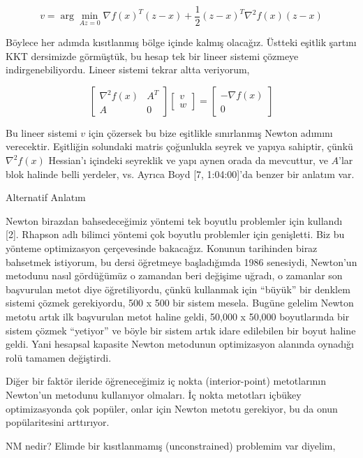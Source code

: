 \documentclass[12pt,fleqn]{article}\usepackage{../../common}
\begin{document}
$$
v = \arg\min_{Az=0} \nabla f(x)^T (z-x) + \frac{1}{2} (z-x)^T \nabla^2 f(x)(z-x)
$$

Böylece her adımda kısıtlanmış bölge içinde kalmış olacağız. Üstteki
eşitlik şartını KKT dersimizde görmüştük, bu hesap tek bir lineer sistemi
çözmeye indirgenebiliyordu. Lineer sistemi tekrar altta veriyorum, 

$$
\left[\begin{array}{cc}
\nabla^2 f(x) & A^T \\ A & 0
\end{array}\right]
\left[\begin{array}{cc}
v \\ w
\end{array}\right] = 
\left[\begin{array}{cc}
-\nabla f(x) \\ 0
\end{array}\right] 
$$

Bu lineer sistemi $v$ için çözersek bu bize eşitlikle sınırlanmış
Newton adımını verecektir. Eşitliğin solundaki matris çoğunlukla seyrek ve
yapıya sahiptir, çünkü $\nabla^2 f(x)$ Hessian'ı içindeki seyreklik ve
yapı aynen orada da mevcuttur, ve $A$'lar blok halinde belli yerdeler, vs. 
Ayrıca Boyd [7, 1:04:00]'da benzer bir anlatım var.

Alternatif Anlatım

Newton birazdan bahsedeceğimiz yöntemi tek boyutlu problemler için kullandı
[2]. Rhapson adlı bilimci yöntemi çok boyutlu problemler için
genişletti. Biz bu yönteme optimizasyon çerçevesinde bakacağız.  Konunun
tarihinden biraz bahsetmek istiyorum, bu dersi öğretmeye başladığımda 1986
senesiydi, Newton'un metodunu nasıl gördüğümüz o zamandan beri değişime
uğradı, o zamanlar son başvurulan metot diye öğretiliyordu, çünkü kullanmak
için ``büyük'' bir denklem sistemi çözmek gerekiyordu, 500 x 500 bir sistem
mesela. Bugüne gelelim Newton metotu artık ilk başvurulan metot haline
geldi, 50,000 x 50,000 boyutlarında bir sistem çözmek ``yetiyor'' ve böyle
bir sistem artık idare edilebilen bir boyut haline geldi. Yani hesapsal
kapasite Newton metodunun optimizasyon alanında oynadığı rolü tamamen
değiştirdi.

Diğer bir faktör ileride öğreneceğimiz iç nokta (interior-point)
metotlarının Newton'un metodunu kullanıyor olmaları. İç nokta metotları
içbükey optimizasyonda çok popüler, onlar için Newton metotu gerekiyor, bu
da onun popülaritesini arttırıyor.

NM nedir? Elimde bir kısıtlanmamış (unconstrained) problemim var diyelim,
\end{document}
